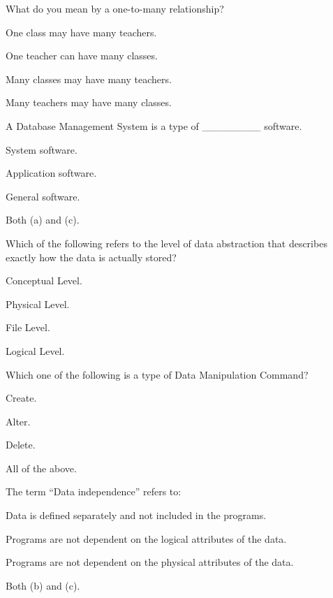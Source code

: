 \documentclass[11pt,a4paper]{article}
\begin{document}
\begin{parts}
  \item What do you mean by a one-to-many relationship?
  
\begin{parts}
    \item One class may have many teachers.
    \item One teacher can have many classes.
    \item Many classes may have many teachers.
    \item Many teachers may have many classes.
  \end{parts}

  \item A Database Management System is a type of \_\_\_\_\_\_\_\_ software.
  
\begin{parts}
    \item System software.
    \item Application software.
    \item General software.
    \item Both (a) and (c).
  \end{parts}

  \item Which of the following refers to the level of data abstraction that describes exactly how the data is actually stored?
  
\begin{parts}
    \item Conceptual Level.
    \item Physical Level.
    \item File Level.
    \item Logical Level.
  \end{parts}

  \item Which one of the following is a type of Data Manipulation Command?
  
\begin{parts}
    \item Create.
    \item Alter.
    \item Delete.
    \item All of the above.
  \end{parts}

  \item The term ``Data independence'' refers to:
  
\begin{parts}
    \item Data is defined separately and not included in the programs.
    \item Programs are not dependent on the logical attributes of the data.
    \item Programs are not dependent on the physical attributes of the data.
    \item Both (b) and (c).
  \end{parts}


\end{parts}
\end{document}

